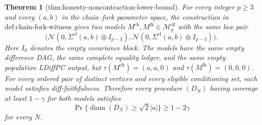 \documentclass{article}
\newtheorem{theorem}{Theorem}
\begin{document}
\begin{theorem}[thm:honesty-noncontraction-lower-bound]\label{thm:honesty-noncontraction-lower-bound}
For every integer \(p\ge3\) and every \((a,b)\) in the chain--fork parameter space, the construction in \(\text{def:chain-fork-witness}\) gives two models \(M^{\mathrm{ch}},M^{\mathrm{fk}}\in\mathcal M_p^{\mathrm{df}}\) with the same law pair
\[
 \bigl(\mathcal N(0,\Sigma^{\mathrm{cf}}(a,b)\oplus I_{p-3}),
 \mathcal N(0,\Sigma^{\mathrm{cf}}(a,b)\oplus I_{p-3})\bigr).
\]
Here \(I_0\) denotes the empty covariance block.  The models have the same empty difference DAG, the same complete equality ledger, and the same empty population LDiffPC output, but \(\tau(M^{\mathrm{ch}})=(a,a,0)\) and \(\tau(M^{\mathrm{fk}})=(0,0,0)\).  For every ordered pair of distinct vertices and every eligible conditioning set, each model satisfies diff-faithfulness.  Therefore every procedure \((D_N)\) having coverage at least \(1-\gamma\) for both models satisfies
\[
 \Pr\{\operatorname{diam}(D_N)\ge\sqrt2|a|\}\ge1-2\gamma
\]
for every \(N\).
\end{theorem}
\end{document}
